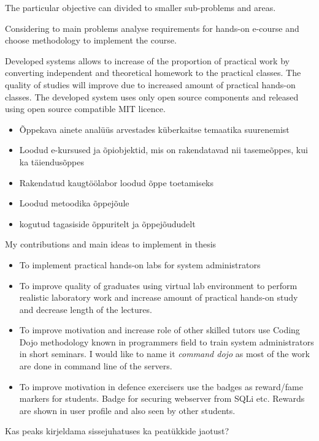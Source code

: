 The particular objective can divided to smaller sub-problems and areas.


Considering to main problems analyse requirements for hands-on e-course and choose methodology to implement the course.

Developed systems allows to  increase of the proportion of practical work by converting independent and theoretical homework to  the practical classes. The quality of studies will improve due to increased amount of practical hands-on classes. The developed system uses only open source components and released using open source compatible MIT licence.



\begin{itemize}
	\item Õppekava ainete analüüs arvestades küberkaitse temaatika suurenemist
	\item Loodud e-kursused ja õpiobjektid, mis on rakendatavad nii tasemeõppes, kui ka täiendusõppes
	\item Rakendatud kaugtöölabor loodud õppe toetamiseks
	\item Loodud metoodika õppejõule
	\item kogutud tagasiside õppuritelt ja õppejõududelt
\end{itemize}


{\large My contributions and main ideas to implement in thesis}
\begin{itemize}
\item To implement practical hands-on labs for system administrators
\item To improve quality of graduates using virtual lab environment  to perform realistic laboratory work and increase amount of practical hands-on study and decrease length of the lectures.
\item To improve motivation and increase role of other skilled tutors use \gls{Coding Dojo} methodology known in programmers field to train system administrators in short seminars. I would like to name it \emph{ command dojo} as most of the work are done in command line of the servers.
\item To improve motivation in defence exercisers use the badges as reward/fame markers for students. Badge for securing webserver from SQLi etc. Rewards are shown in user profile and also seen by other students.
\end{itemize}
\par
{\color{red} Kas peaks kirjeldama sissejuhatuses ka peatükkide jaotust? }
 
